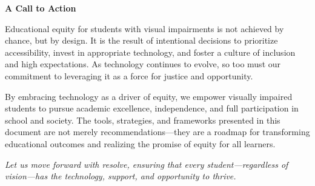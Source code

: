 \textbf{A Call to Action}

Educational equity for students with visual impairments is not achieved by chance, but by design. It is the result of intentional decisions to prioritize accessibility, invest in appropriate technology, and foster a culture of inclusion and high expectations. As technology continues to evolve, so too must our commitment to leveraging it as a force for justice and opportunity.

By embracing technology as a driver of equity, we empower visually impaired students to pursue academic excellence, independence, and full participation in school and society. The tools, strategies, and frameworks presented in this document are not merely recommendations—they are a roadmap for transforming educational outcomes and realizing the promise of equity for all learners.

\bigskip

\noindent\textit{Let us move forward with resolve, ensuring that every student—regardless of vision—has the technology, support, and opportunity to thrive.}

